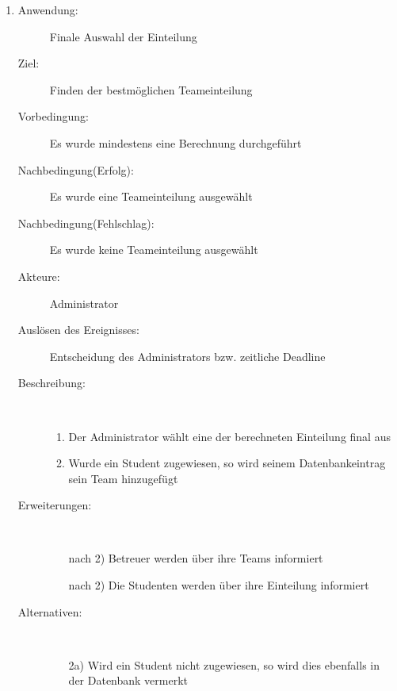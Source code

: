 \documentclass[parskip=full]{scrartcl}
\newcommand{\swtLabel}[1]{\textbf{\textbackslash #1\arabic*0\textbackslash}}
\begin{document}
\begin{enumerate} [label=\swtLabel{A}]
  
  \item
  \begin{description}
  \item[Anwendung:] Finale Auswahl der Einteilung
  \item[Ziel:] Finden der bestmöglichen Teameinteilung
  	\item[Vorbedingung:] Es wurde mindestens eine Berechnung durchgeführt
  	\item[Nachbedingung(Erfolg):] Es wurde eine Teameinteilung ausgewählt
  	\item[Nachbedingung(Fehlschlag):] Es wurde keine Teameinteilung ausgewählt
  	\item[Akteure:] Administrator
  	\item[Auslösen des Ereignisses:] Entscheidung des Administrators bzw.
  	zeitliche Deadline
  	\item[Beschreibung:]~
  	\begin{enumerate} 
  	  \item Der Administrator wählt eine der berechneten Einteilung final aus
  	  \item Wurde ein Student zugewiesen, so wird seinem Datenbankeintrag sein
  	  Team hinzugefügt
  	\end{enumerate}
  	\item[Erweiterungen:]~
  	\begin{enumerate}
  	  \item[nach 2)] Betreuer werden über ihre Teams informiert
  	  \item[nach 2)] Die Studenten werden über ihre Einteilung informiert
  	 \end{enumerate}
  	\item[Alternativen:] ~
  	\begin{enumerate}
  	  \item[2a)] Wird ein Student nicht zugewiesen, so wird dies ebenfalls in der
  	  Datenbank vermerkt
  	 \end{enumerate}  
  \end{description}
   

\end{enumerate}
\end{document}
